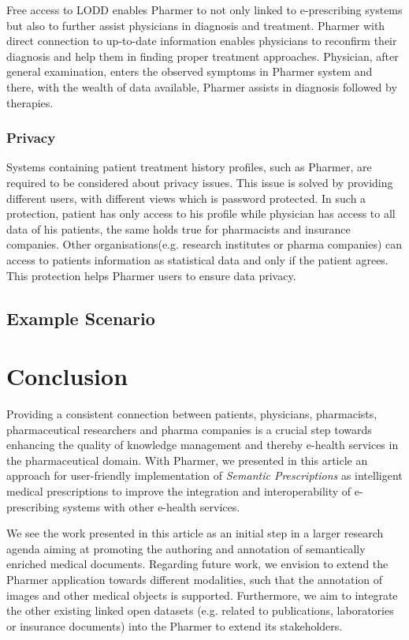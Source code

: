 \documentclass[journal]{IEEEtran}
\begin{document}
Free access to LODD enables Pharmer to not only linked to e-prescribing systems but also to further assist physicians in diagnosis and treatment. Pharmer with direct connection to up-to-date information enables physicians to reconfirm their diagnosis and help them in finding proper treatment approaches.
Physician, after general examination, enters the observed symptoms in Pharmer system and there, with the wealth of data available, Pharmer assists in diagnosis followed by therapies.

\subsubsection{Privacy}
 Systems containing patient treatment history profiles, such as Pharmer, are required to be considered about privacy issues.
 This issue is solved by providing different users, with different views which is password protected.
 In such a protection, patient has only access to his profile while physician has access to all data of his patients, the same holds true for pharmacists and insurance companies.
 Other organisations(e.g. research institutes or pharma companies) can access to patients information as statistical data and only if the patient agrees.
 This protection helps Pharmer users to ensure data privacy.

\subsection{Example Scenario}
\label{sec:example}


\section{Conclusion}
\label{sec:conclusion}

Providing a consistent connection between patients, physicians, pharmacists, pharmaceutical researchers and pharma companies is a crucial step towards enhancing the quality of knowledge management and thereby e-health services in the pharmaceutical domain.
With Pharmer, we presented in this article an approach for user-friendly implementation of \emph{Semantic Prescriptions} as intelligent medical prescriptions to improve the integration and interoperability of e-prescribing systems with other e-health services.

We see the work presented in this article as an initial step in a larger research agenda aiming at promoting the authoring and annotation of semantically enriched medical documents.
Regarding future work, we envision to extend the Pharmer application towards different modalities, such that the annotation of images and other medical objects is supported.
Furthermore, we aim to integrate the other existing linked open datasets (e.g. related to publications, laboratories or insurance documents) into the Pharmer to extend its stakeholders.
\end{document}
